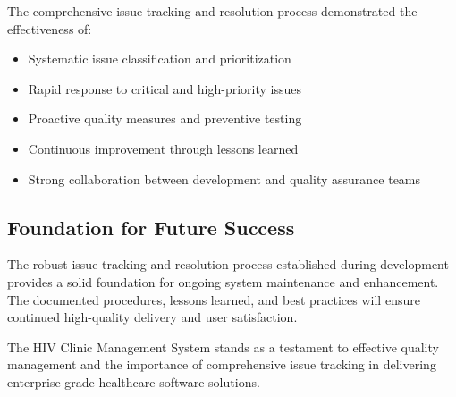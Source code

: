 \documentclass[12pt,a4paper]{article}
\begin{document}
The comprehensive issue tracking and resolution process demonstrated the effectiveness of:

\begin{itemize}
    \item Systematic issue classification and prioritization
    \item Rapid response to critical and high-priority issues
    \item Proactive quality measures and preventive testing
    \item Continuous improvement through lessons learned
    \item Strong collaboration between development and quality assurance teams
\end{itemize}

\subsection{Foundation for Future Success}

The robust issue tracking and resolution process established during development provides a solid foundation for ongoing system maintenance and enhancement. The documented procedures, lessons learned, and best practices will ensure continued high-quality delivery and user satisfaction.

The HIV Clinic Management System stands as a testament to effective quality management and the importance of comprehensive issue tracking in delivering enterprise-grade healthcare software solutions.
\end{document}
